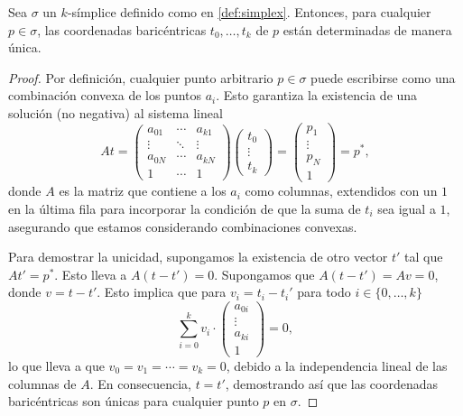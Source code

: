 \begin{proposicion}
	Sea $\sigma$ un $k$-símplice definido como en \ref{def:simplex}. Entonces, para
	cualquier $p \in \sigma$, las coordenadas baricéntricas $t_{0}, \ldots, t_{k}$
	de $p$ están determinadas de manera única.
\end{proposicion}
\begin{proof}
	Por definición, cualquier punto arbitrario $p \in \sigma$ puede escribirse
	como una combinación convexa de los puntos $a_{i}$. Esto garantiza la existencia
	de una solución (no negativa) al sistema lineal
	\[
	At= \left(
	\begin{array}{ccc}
		a_{01} & \cdots & a_{k1} \\
		\vdots & \ddots & \vdots \\
		a_{0N} & \cdots & a_{kN} \\
		1      & \cdots & 1
	\end{array}
	\right) \left(
	\begin{array}{c}
		t_0    \\
		\vdots \\
		t_k
	\end{array}
	\right) = \left(
	\begin{array}{c}
		p_1    \\
		\vdots \\
		p_N    \\
		1
	\end{array}
	\right) = p^{*},
	\]
	donde $A$ es la matriz que contiene a los $a_{i}$ como columnas, extendidos
	con un $1$ en la última fila para incorporar la condición de que la suma de
	$t_{i}$ sea igual a $1$, asegurando que estamos considerando combinaciones convexas.
	
	Para demostrar la unicidad, supongamos la existencia de otro vector $t'$ tal
	que $A t'= p^{*}$. Esto lleva a $A(t - t' ) = 0$. Supongamos que
	$A(t - t') = A v = 0$, donde $v = t - t'$. Esto implica que para
	$v_{i}= t_{i}- t_{i}'$ para todo $i \in \{0, \ldots, k\}$
	\[
	\sum_{i=0}^{k}v_{i}\cdot \left(
	\begin{array}{c}
		a_{0i} \\
		\vdots \\
		a_{ki} \\
		1
	\end{array}
	\right) = 0,
	\]
	lo que lleva a que $v_{0}= v_{1}= \cdots = v_{k}= 0$, debido a la independencia
	lineal de las columnas de $A$. En consecuencia, $t= t'$, demostrando así que
	las coordenadas baricéntricas son únicas para cualquier punto $p$ en $\sigma$.
\end{proof}

